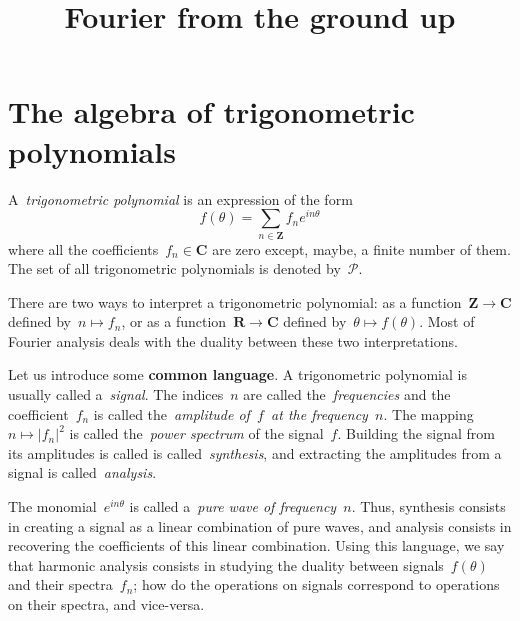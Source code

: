 \title{Fourier from the ground up}


\section{The algebra of trigonometric polynomials}

\newcommand{\Z}{\mathbf{Z}}
\newcommand{\Q}{\mathbf{Q}}
\newcommand{\R}{\mathbf{R}}
\newcommand{\C}{\mathbf{C}}
\newcommand{\PP}{\mathcal{P}}
\newcommand{\ud}{\mathrm{d}}
\newcommand{\ds}{\displaystyle}
\newcommand{\DFT}{\mathtt{DFT}}
\newcommand{\IDFT}{\mathtt{IDFT}}


\begin{definition}
A~\emph{trigonometric polynomial} is an expression of the form
$$
	f(\theta)=\sum_{n\in\Z} f_n e^{in\theta}
$$
where all the coefficients~$f_n\in\C$ are zero except, maybe, a finite
number of them.  The set of all trigonometric polynomials is denoted
by~$\PP$.
\end{definition}

There are two ways to interpret a trigonometric polynomial: as a
function~$\Z\to\C$ defined by~$n\mapsto f_n$, or as a function~$\R\to\C$
defined by~$\theta\mapsto f(\theta)$.
Most of Fourier analysis deals with
the duality between these two interpretations.

Let us introduce some {\bf common language}.
A trigonometric polynomial is usually called a~\emph{signal}.  The
indices~$n$ are called the~\emph{frequencies} and the coefficient~$f_n$
is called the~\emph{amplitude of~$f$~at the frequency~$n$}.  The
mapping~$n\mapsto\left|f_n\right|^2$ is called the~\emph{power
spectrum} of the signal~$f$.  Building the signal from its amplitudes
is called is called~\emph{synthesis}, and extracting the amplitudes
from a signal is called~\emph{analysis}.

The monomial~$e^{in\theta}$ is called a~\emph{pure wave of frequency~$n$}.
Thus, synthesis consists in creating a signal as a linear combination of pure
waves, and analysis consists in recovering the coefficients of this linear
combination.  Using this language, we say that harmonic analysis consists in
studying the duality between signals~$f(\theta)$ and their spectra~$f_n$; how
do the operations on signals correspond to operations on their spectra, and
vice-versa.


